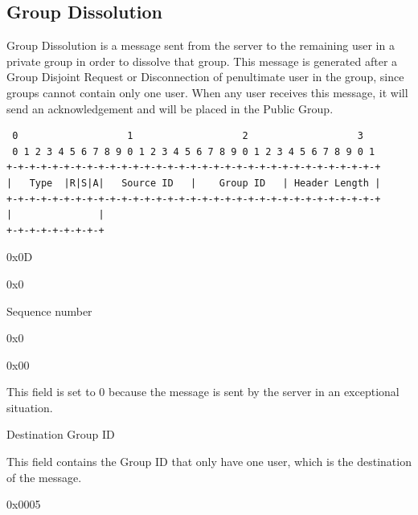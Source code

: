 \documentclass{article}
\begin{document}
\subsection{Group Dissolution}
Group Dissolution is a message sent from the server to the remaining user in a private group in order to dissolve that group. This message is generated after a Group Disjoint Request or Disconnection of penultimate user in the group, since groups cannot contain only one user. When any user receives this message, it will send an acknowledgement and will be placed in the Public Group.
\begin{verbatim}  
 0                   1                   2                   3  
 0 1 2 3 4 5 6 7 8 9 0 1 2 3 4 5 6 7 8 9 0 1 2 3 4 5 6 7 8 9 0 1
+-+-+-+-+-+-+-+-+-+-+-+-+-+-+-+-+-+-+-+-+-+-+-+-+-+-+-+-+-+-+-+-+
|   Type  |R|S|A|   Source ID   |    Group ID   | Header Length |
+-+-+-+-+-+-+-+-+-+-+-+-+-+-+-+-+-+-+-+-+-+-+-+-+-+-+-+-+-+-+-+-+
|               |
+-+-+-+-+-+-+-+-+
\end{verbatim}
\begin{description}[align=left]
    \item [Type:] 0x0D
    
    \item [Reserved:] 0x0
        
    \item [Sequence:] Sequence number
    
    \item [Acknowledgement:] 0x0
    
    \item [Source ID:] 0x00
    \begin{flushleft}
        This field is set to 0 because the message is sent by the server in an exceptional situation.
    \end{flushleft}
    
    \item [Group ID:] Destination Group ID
    \begin{flushleft}
        This field contains the Group ID that only have one user, which is the destination of the message.
    \end{flushleft}
    
    \item [Header Length:] 0x0005

\end{description}
\end{document}
